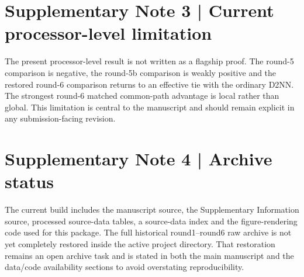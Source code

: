 \documentclass[11pt]{article}
\begin{document}
\section*{Supplementary Note 3 | Current processor-level limitation}
The present processor-level result is not written as a flagship proof. The round-5 comparison is negative, the round-5b comparison is weakly positive and the restored round-6 comparison returns to an effective tie with the ordinary D2NN. The strongest round-6 matched common-path advantage is local rather than global. This limitation is central to the manuscript and should remain explicit in any submission-facing revision.

\section*{Supplementary Note 4 | Archive status}
The current build includes the manuscript source, the Supplementary Information source, processed source-data tables, a source-data index and the figure-rendering code used for this package. The full historical round1--round6 raw archive is not yet completely restored inside the active project directory. That restoration remains an open archive task and is stated in both the main manuscript and the data/code availability sections to avoid overstating reproducibility.
\end{document}
